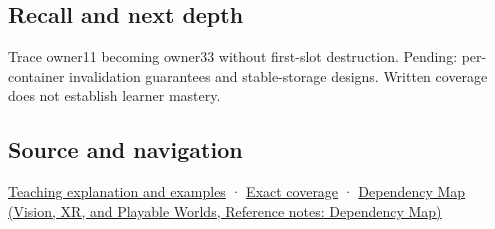 \subsection{Recall and next depth}\label{appendix-f9b8b9188c7f-recall-and-next-depth}

Trace owner11 becoming owner33 without first-slot destruction. Pending: per-container invalidation guarantees and stable-storage designs. Written coverage does not establish learner mastery.

\subsection{Source and navigation}\label{appendix-f9b8b9188c7f-source-and-navigation}

\hyperref[01-foundations-i-ch003-when-a-valid-borrow-stops-naming-the-intended-thing]{Teaching explanation and examples} · \hyperref[appendix-fd090d982a15-m008---parts-113-126]{Exact coverage} · \href{../07-Vision-XR-and-Playable-Worlds/main.pdf\#nameddest=appendix-4ad47bdd269a}{Dependency Map (Vision, XR, and Playable Worlds, Reference notes: Dependency Map)}
